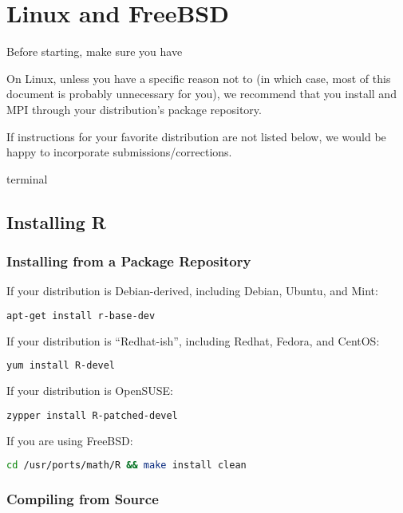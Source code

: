 \section{Linux and FreeBSD}

Before starting, make sure you have 

On Linux, unless you have a specific reason not to (in which case, most of this document is probably unnecessary for you), we recommend that you install  and MPI through your distribution's package repository.

If instructions for your favorite distribution are not listed below, we would be happy to incorporate submissions/corrections.


terminal



\subsection{Installing R}

\subsubsection{Installing from a Package Repository}

If your distribution is Debian-derived, including Debian, Ubuntu, and Mint:
\begin{lstlisting}[language=sh]
apt-get install r-base-dev
\end{lstlisting}

\vspace{.4cm}
If your distribution is ``Redhat-ish'', including Redhat, Fedora, and CentOS:
\begin{lstlisting}[language=sh]
yum install R-devel
\end{lstlisting}

\vspace{.4cm}
If your distribution is OpenSUSE:
\begin{lstlisting}[language=sh]
zypper install R-patched-devel
\end{lstlisting}

\vspace{.4cm}
If you are using FreeBSD:
\begin{lstlisting}[language=sh]
cd /usr/ports/math/R && make install clean
\end{lstlisting}



\subsubsection{Compiling from Source}

